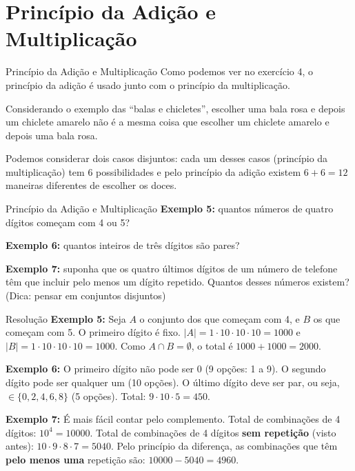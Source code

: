 \documentclass[9pt]{beamer}
\begin{document}
\section{Princípio da Adição e Multiplicação}
\begin{frame}{Princípio da Adição e Multiplicação}
Como podemos ver no exercício 4, o princípio da adição é usado junto com o princípio da multiplicação.
\vspace{0.3cm}

Considerando o exemplo das ``balas e chicletes'', escolher uma bala rosa e depois um chiclete amarelo não é a mesma coisa que escolher um chiclete amarelo e depois uma bala rosa.
\vspace{0.3cm}

Podemos considerar dois casos disjuntos: cada um desses casos (princípio da multiplicação) tem 6 possibilidades e pelo princípio da adição existem $6+6=12$ maneiras diferentes de escolher os doces.
\end{frame}

\begin{frame}{Princípio da Adição e Multiplicação}
\textbf{Exemplo 5:} quantos números de quatro dígitos começam com 4 ou 5?

\vspace{0.4cm}

\textbf{Exemplo 6:} quantos inteiros de três dígitos são pares?

\vspace{0.4cm}

\textbf{Exemplo 7:} suponha que os quatro últimos dígitos de um número de telefone têm que incluir pelo menos um dígito repetido. Quantos desses números existem? (Dica: pensar em conjuntos disjuntos)
\end{frame}

\begin{frame}{Resolução}
\textbf{Exemplo 5:}
Seja $A$ o conjunto dos que começam com 4, e $B$ os que começam com 5. O primeiro dígito é fixo.
$|A| = 1 \cdot 10 \cdot 10 \cdot 10 = 1000$ e $|B| = 1 \cdot 10 \cdot 10 \cdot 10 = 1000$.
Como $A \cap B = \emptyset$, o total é $1000 + 1000 = 2000$.

\vspace{0.3cm}

\textbf{Exemplo 6:}
O primeiro dígito não pode ser 0 (9 opções: 1 a 9). O segundo dígito pode ser qualquer um (10 opções). O último dígito deve ser par, ou seja, $\in \{0,2,4,6,8\}$ (5 opções).
Total: $9 \cdot 10 \cdot 5 = 450$.

\vspace{0.3cm}

\textbf{Exemplo 7:}
É mais fácil contar pelo complemento.
Total de combinações de 4 dígitos: $10^4 = 10000$.
Total de combinações de 4 dígitos \textbf{sem repetição} (visto antes): $10 \cdot 9 \cdot 8 \cdot 7 = 5040$.
Pelo princípio da diferença, as combinações que têm \textbf{pelo menos uma} repetição são:
$10000 - 5040 = 4960$.
\end{frame}
\end{document}
